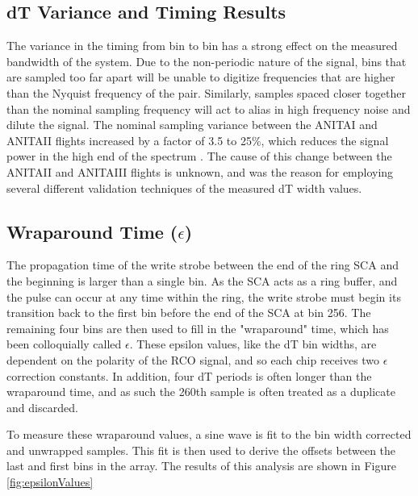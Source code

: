 	
	
	


	\subsection{dT Variance and Timing Results}	
		The variance in the timing from bin to bin has a strong effect on the measured bandwidth of the system.  Due to the non-periodic nature of the signal, bins that are sampled too far apart will be unable to digitize frequencies that are higher than the Nyquist frequency of the pair.  Similarly, samples spaced closer together than the nominal sampling frequency will act to alias in high frequency noise and dilute the signal.  The nominal sampling variance between the ANITAI and ANITAII flights increased by a factor of 3.5 to 25\%, which reduces the signal power in the high end of the spectrum .  The cause of this change between the ANITAII and ANITAIII flights is unknown, and was the reason for employing several different validation techniques of the measured dT width values.
		
		
	\subsection{Wraparound Time ($\epsilon$)}
		The propagation time of the write strobe between the end of the ring SCA and the beginning is larger than a single bin.  As the SCA acts as a ring buffer, and the pulse can occur at any time within the ring, the write strobe must begin its transition back to the first bin before the end of the SCA at bin 256.  The remaining four bins are then used to fill in the "wraparound" time, which has been colloquially called $\epsilon$.  These epsilon values, like the dT bin widths, are dependent on the polarity of the RCO signal, and so each chip receives two $\epsilon$ correction constants. In addition, four dT periods is often longer than the wraparound time, and as such the 260th sample is often treated as a duplicate and discarded.
		
		To measure these wraparound values, a sine wave is fit to the bin width corrected and unwrapped samples.  This fit is then used to derive the offsets between the last and first bins in the array.  The results of this analysis are shown in Figure \ref{fig:epsilonValues}
		
